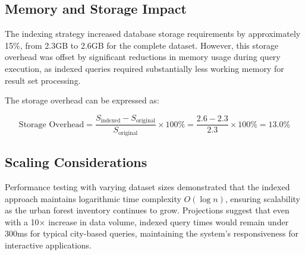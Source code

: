 \subsection{Memory and Storage Impact}

The indexing strategy increased database storage requirements by approximately 15\%, from 2.3GB to 2.6GB for the complete dataset. However, this storage overhead was offset by significant reductions in memory usage during query execution, as indexed queries required substantially less working memory for result set processing.

The storage overhead can be expressed as:

\begin{equation}
\text{Storage Overhead} = \frac{S_{\text{indexed}} - S_{\text{original}}}{S_{\text{original}}} \times 100\% = \frac{2.6 - 2.3}{2.3} \times 100\% = 13.0\%
\end{equation}

\subsection{Scaling Considerations}

Performance testing with varying dataset sizes demonstrated that the indexed approach maintains logarithmic time complexity $O(\log n)$, ensuring scalability as the urban forest inventory continues to grow. Projections suggest that even with a 10$\times$ increase in data volume, indexed query times would remain under 300ms for typical city-based queries, maintaining the system's responsiveness for interactive applications.
